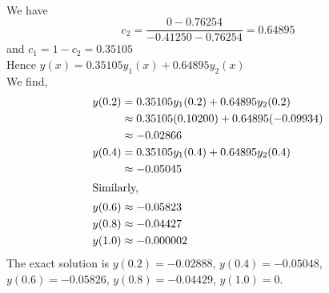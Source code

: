 \documentclass[../main-sheet.tex]{subfiles}
\begin{document}
\begin{soln}
\begin{align*}
    \end{align*}
    We have
    \[c_2=\frac{0-0.76254}{-0.41250-0.76254}=0.64895\]
    and \(c_1=1-c_2=0.35105\)\\
    Hence \(y(x)=0.35105y_1(x)+0.64895y_2(x)\)\\
    We find,
    \begin{align*}
        y(0.2)&=0.35105y_1(0.2)+0.64895y_2(0.2)\\
        &\approx 0.35105(0.10200)+0.64895(-0.09934)\\
        &\approx -0.02866\\
        y(0.4)&=0.35105y_1(0.4)+0.64895y_2(0.4)\\
        &\approx -0.05045\\
        \intertext{Similarly,}
        y(0.6)&\approx -0.05823\\
        y(0.8)&\approx -0.04427\\
        y(1.0)&\approx -0.000002
    \end{align*}
    The exact solution is \(y(0.2)=-0.02888\), \(y(0.4)=-0.05048\), \(y(0.6)=-0.05826\), \(y(0.8)=-0.04429\), \(y(1.0)=0\).
\end{soln}
\end{document}
